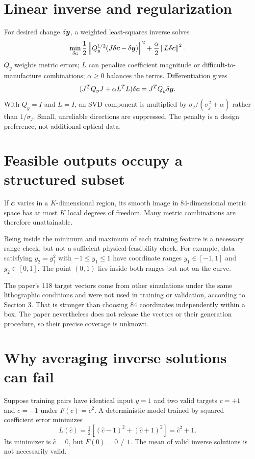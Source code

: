\section{Linear inverse and regularization}
For desired change $\delta\bm{y}$, a weighted least-squares inverse solves
\begin{equation}
\min_{\delta\bm{c}}
\frac12\left\lVert Q_y^{1/2}(J\delta\bm{c}-\delta\bm{y})\right\rVert^2
+\frac{\alpha}{2}\left\lVert L\delta\bm{c}\right\rVert^2.
\label{eq:regularized}
\end{equation}
$Q_y$ weights metric errors; $L$ can penalize coefficient magnitude
or difficult-to-manufacture combinations; $\alpha\geq0$ balances the terms.
Differentiation gives
\begin{equation}
(J^TQ_yJ+\alpha L^TL)\delta\bm{c}=J^TQ_y\delta\bm{y}.
\end{equation}
With $Q_y=I$ and $L=I$, an SVD component is multiplied by
$\sigma_j/(\sigma_j^2+\alpha)$ rather than $1/\sigma_j$.
Small, unreliable directions are suppressed.
The penalty is a design preference, not additional optical data.

\section{Feasible outputs occupy a structured subset}
If $\bm{c}$ varies in a $K$-dimensional region, its smooth image in
84-dimensional metric space has at most $K$ local degrees of freedom.
Many metric combinations are therefore unattainable.

Being inside the minimum and maximum of each training feature is a
necessary range check, but not a sufficient physical-feasibility check.
For example, data satisfying $y_2=y_1^2$ with $-1\leq y_1\leq1$ have
coordinate ranges $y_1\in[-1,1]$ and $y_2\in[0,1]$.
The point $(0,1)$ lies inside both ranges but not on the curve.

The paper's 118 target vectors come from other simulations under the same
lithographic conditions and were not used in training or validation,
according to Section 3. That is stronger than choosing 84 coordinates
independently within a box. The paper nevertheless does not release the
vectors or their generation procedure, so their precise coverage is unknown.

\section{Why averaging inverse solutions can fail}
Suppose training pairs have identical input $y=1$ and two valid targets
$c=+1$ and $c=-1$ under $F(c)=c^2$.
A deterministic model trained by squared coefficient error minimizes
\[
L(\hat c)=\tfrac12[(\hat c-1)^2+(\hat c+1)^2]=\hat c^2+1.
\]
Its minimizer is $\hat c=0$, but $F(0)=0\ne1$.
The mean of valid inverse solutions is not necessarily valid.

